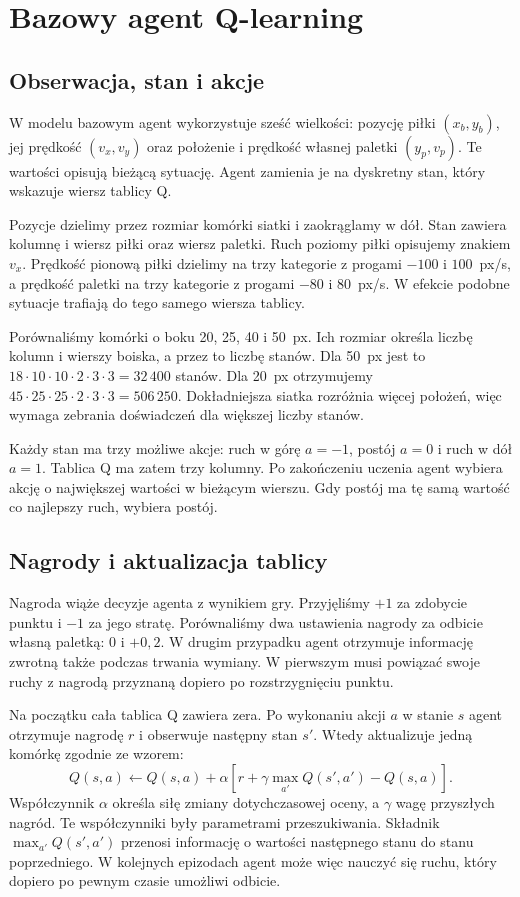 \documentclass[11pt,a4paper]{article}
\begin{document}
\section{Bazowy agent Q-learning}

\subsection{Obserwacja, stan i akcje}

W modelu bazowym agent wykorzystuje sześć wielkości: pozycję piłki $(x_b,y_b)$,
jej prędkość $(v_x,v_y)$ oraz położenie i prędkość własnej paletki
$(y_p,v_p)$. Te wartości opisują bieżącą sytuację. Agent zamienia je
na dyskretny stan, który wskazuje wiersz tablicy Q.

Pozycje dzielimy przez rozmiar komórki siatki i zaokrąglamy w dół.
Stan zawiera kolumnę i wiersz piłki oraz wiersz paletki. Ruch poziomy
piłki opisujemy znakiem $v_x$. Prędkość pionową piłki dzielimy na trzy
kategorie z progami $-100$ i $100$~px/s, a prędkość paletki na trzy
kategorie z progami $-80$ i $80$~px/s. W efekcie podobne sytuacje
trafiają do tego samego wiersza tablicy.

Porównaliśmy komórki o boku 20, 25, 40 i 50~px. Ich rozmiar określa
liczbę kolumn i wierszy boiska, a przez to liczbę stanów. Dla 50~px
jest to $18\cdot10\cdot10\cdot2\cdot3\cdot3=32\,400$ stanów.
Dla 20~px otrzymujemy $45\cdot25\cdot25\cdot2\cdot3\cdot3=506\,250$.
Dokładniejsza siatka rozróżnia więcej położeń, więc wymaga zebrania
doświadczeń dla większej liczby stanów.

Każdy stan ma trzy możliwe akcje: ruch w górę $a=-1$, postój $a=0$
i ruch w dół $a=1$. Tablica Q ma zatem trzy kolumny. Po zakończeniu
uczenia agent wybiera akcję o największej wartości w bieżącym wierszu.
Gdy postój ma tę samą wartość co najlepszy ruch, wybiera postój.

\subsection{Nagrody i aktualizacja tablicy}

Nagroda wiąże decyzje agenta z wynikiem gry. Przyjęliśmy $+1$ za zdobycie
punktu i $-1$ za jego stratę. Porównaliśmy dwa ustawienia nagrody za
odbicie własną paletką: 0 i $+0{,}2$. W drugim przypadku agent otrzymuje
informację zwrotną także podczas trwania wymiany. W pierwszym musi
powiązać swoje ruchy z nagrodą przyznaną dopiero po rozstrzygnięciu punktu.

Na początku cała tablica Q zawiera zera. Po wykonaniu akcji $a$ w stanie
$s$ agent otrzymuje nagrodę $r$ i obserwuje następny stan $s'$. Wtedy
aktualizuje jedną komórkę zgodnie ze wzorem:
\begin{equation}
Q(s,a)\leftarrow Q(s,a)+\alpha\left[r+\gamma\max_{a'}Q(s',a')-Q(s,a)\right].
\label{eq:qlearning}
\end{equation}
Współczynnik $\alpha$ określa siłę zmiany dotychczasowej oceny, a
$\gamma$ wagę przyszłych nagród. Te współczynniki były parametrami
przeszukiwania. Składnik $\max_{a'}Q(s',a')$ przenosi informację o wartości następnego
stanu do stanu poprzedniego. W kolejnych epizodach agent może więc
nauczyć się ruchu, który dopiero po pewnym czasie umożliwi odbicie.
\end{document}
